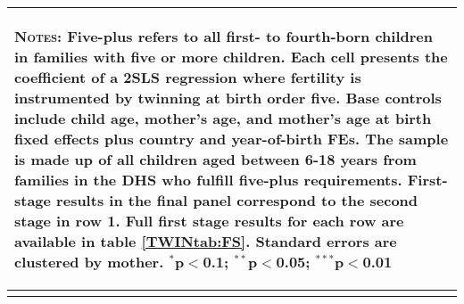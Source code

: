 \begin{table}[!htbp]
\begin{tabular}{lcccc}
\hline\multicolumn{5}{p{10.0cm}}{\begin{footnotesize}\textsc{Notes:} Five-plus refers to all first- to fourth-born children in families with five or more children.  Each cell presents the coefficient of a 2SLS regression where fertility is instrumented by twinning at birth order five.  Base controls include child age, mother's age, and mother's age at birth fixed effects plus country and year-of-birth FEs.  The sample is made up of all children aged between 6-18 years from families in the DHS who fulfill five-plus requirements. First-stage results in the final panel correspond to the second stage in row 1.  Full first stage results for each row are available in table \ref{TWINtab:FS}. Standard errors are clustered by mother. 
$^{*}$p$<$0.1; $^{**}$p$<$0.05; $^{***}$p$<$0.01\end{footnotesize}}
\\\bottomrule\normalsize\end{tabular}\end{table} 

